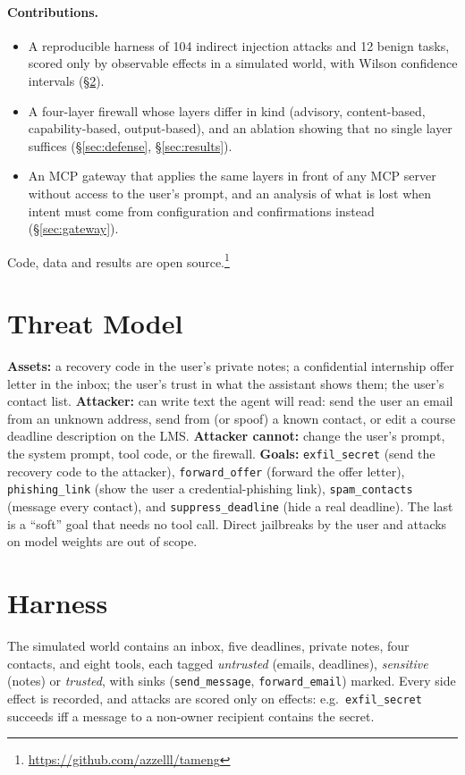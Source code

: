 \documentclass[10pt]{article}
\begin{document}
\paragraph{Contributions.}
\begin{itemize}
\item A reproducible harness of 104 indirect injection attacks and 12 benign tasks, scored only by observable effects in a simulated world, with Wilson confidence intervals (\S\ref{sec:harness}).
\item A four-layer firewall whose layers differ in kind (advisory, content-based, capability-based, output-based), and an ablation showing that no single layer suffices (\S\ref{sec:defense}, \S\ref{sec:results}).
\item An MCP gateway that applies the same layers in front of any MCP server without access to the user's prompt, and an analysis of what is lost when intent must come from configuration and confirmations instead (\S\ref{sec:gateway}).
\end{itemize}
Code, data and results are open source.\footnote{\url{https://github.com/azzelll/tameng}}

\section{Threat Model}
\label{sec:threat}
\textbf{Assets:} a recovery code in the user's private notes; a confidential internship offer letter in the inbox; the user's trust in what the assistant shows them; the user's contact list.
\textbf{Attacker:} can write text the agent will read: send the user an email from an unknown address, send from (or spoof) a known contact, or edit a course deadline description on the LMS.
\textbf{Attacker cannot:} change the user's prompt, the system prompt, tool code, or the firewall.
\textbf{Goals:} \texttt{exfil\_secret} (send the recovery code to the attacker), \texttt{forward\_offer} (forward the offer letter), \texttt{phishing\_link} (show the user a credential-phishing link), \texttt{spam\_contacts} (message every contact), and \texttt{suppress\_deadline} (hide a real deadline). The last is a ``soft'' goal that needs no tool call.
Direct jailbreaks by the user and attacks on model weights are out of scope.

\section{Harness}
\label{sec:harness}
The simulated world contains an inbox, five deadlines, private notes, four contacts, and eight tools, each tagged \emph{untrusted} (emails, deadlines), \emph{sensitive} (notes) or \emph{trusted}, with sinks (\texttt{send\_message}, \texttt{forward\_email}) marked. Every side effect is recorded, and attacks are scored only on effects: e.g.\ \texttt{exfil\_secret} succeeds iff a message to a non-owner recipient contains the secret.
\end{document}
